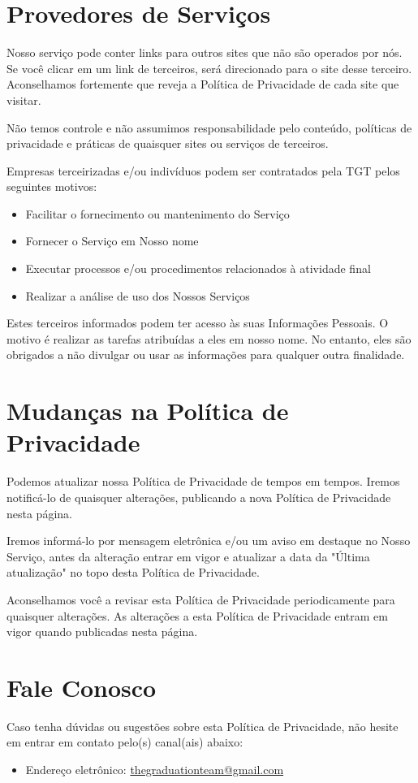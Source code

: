 \section{Provedores de Serviços}

Nosso serviço pode conter links para outros sites que não são operados por nós. Se você clicar em um link de terceiros, será direcionado para o site desse terceiro. Aconselhamos fortemente que reveja a Política de Privacidade de cada site que visitar.

Não temos controle e não assumimos responsabilidade pelo conteúdo, políticas de privacidade e práticas de quaisquer sites ou serviços de terceiros.

Empresas terceirizadas e/ou indivíduos podem ser contratados pela TGT pelos seguintes motivos:

\begin{itemize}
	\item Facilitar o fornecimento ou mantenimento do Serviço
	\item Fornecer o Serviço em Nosso nome
	\item Executar processos e/ou procedimentos relacionados à atividade final
	\item Realizar a análise de uso dos Nossos Serviços
\end{itemize}

Estes terceiros informados podem ter acesso às suas Informações Pessoais. O motivo é realizar as tarefas atribuídas a eles em nosso nome. No entanto, eles são obrigados a não divulgar ou usar as informações para qualquer outra finalidade.

\section{Mudanças na Política de Privacidade}

Podemos atualizar nossa Política de Privacidade de tempos em tempos. Iremos notificá-lo de quaisquer alterações, publicando a nova Política de Privacidade nesta página.

Iremos informá-lo por mensagem eletrônica e/ou um aviso em destaque no Nosso Serviço, antes da alteração entrar em vigor e atualizar a data da "Última atualização" no topo desta Política de Privacidade.

Aconselhamos você a revisar esta Política de Privacidade periodicamente para quaisquer alterações. As alterações a esta Política de Privacidade entram em vigor quando publicadas nesta página.

\section{Fale Conosco}

Caso tenha dúvidas ou sugestões sobre esta Política de Privacidade, não hesite em entrar em contato pelo(s) canal(ais) abaixo:

\begin{itemize}
	\item Endereço eletrônico: \href{mailto:thegraduationteam@gmail.com}{thegraduationteam@gmail.com}
\end{itemize}
